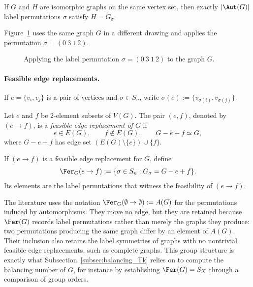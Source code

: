 \begin{remark}\label{rmk:aut-many-sigmas}
    If $G$ and $H$ are isomorphic graphs on the same vertex set, then exactly $|\Aut(G)|$ label permutations $\sigma$ satisfy $H=G_\sigma$.
\end{remark}

Figure~\ref{fig:sigma_intro_2} uses the same graph $G$ in a different drawing and applies the permutation $\sigma=(0\ 3\ 1\ 2)$.

\begin{figure}[htbp]
    \centering
    
    \caption{Applying the label permutation $\sigma=(0\ 3\ 1\ 2)$ to the graph $G$.}
    \label{fig:sigma_intro_2}
\end{figure}

\paragraph{Feasible edge replacements.}

If $e=\{v_i,v_j\}$ is a pair of vertices and $\sigma\in S_n$, write
$\sigma(e):=\{v_{\sigma(i)},v_{\sigma(j)}\}$.

\begin{definition}\label{def:feasible-fer}
    Let $e$ and $f$ be $2$-element subsets of $V(G)$.
    The pair $(e,f)$, denoted by $(e\to f)$, is a \emph{feasible edge replacement of $G$} if
    \[
        e\in E(G),\qquad f\notin E(G),\qquad G-e+f\simeq G,
    \]
    where $G-e+f$ has edge set $(E(G)\setminus\{e\})\cup\{f\}$.
\end{definition}

\begin{definition}\label{def:fer-witness-set}
    If $(e\to f)$ is a feasible edge replacement for $G$, define
    \[
        \Fer_G(e\to f):=\{\sigma\in S_n:G_\sigma=G-e+f\}.
    \]
    Its elements are the label permutations that witness the feasibility of $(e\to f)$.
\end{definition}

The literature uses the notation $\Fer_G(\emptyset\to\emptyset):=A(G)$ for the permutations induced by automorphisms.
They move no edge, but they are retained because $\Fer(G)$ records label permutations rather than merely the graphs they produce: two permutations producing the same graph differ by an element of $A(G)$.
Their inclusion also retains the label symmetries of graphs with no nontrivial feasible edge replacements, such as complete graphs.
This group structure is exactly what Subsection~\ref{subsec:balancing_Tk} relies on to compute the balancing number of $G$, for instance by establishing $\Fer(G)=S_X$ through a comparison of group orders.

